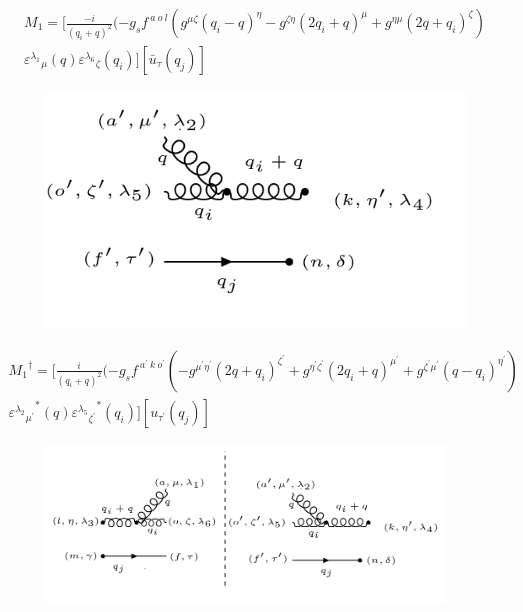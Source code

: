\begin{equation}
\begin{split}
M_1=[\frac{-i}{(q_i +q)^2}(-g_s f^{\:a\:o\:l}(g^{{\mu}{\zeta}}(q_i-q)^{\eta}-g^{{\zeta}{\eta}}(2q_i +q)^{\mu}+g^{{\eta}{\mu}}(2q +q_i)^{\zeta})\\
{\varepsilon^{\lambda_1}}_{\mu} (q) {\varepsilon^{\lambda_6}}_{\zeta} (q_i)][\bar{u}_{\tau}(q_j)]
\end{split}
\end{equation}
\begin{figure}[ht!]
\centering
\includegraphics[scale=0.7]{images/ggqM1dagger.png}
\end{figure}
\begin{equation}
\begin{split}
{M_1}^{\dagger}=[\frac{i}{(q_i +q)^2}(-g_s f^{\:a^{\prime}\:k\: o^{\prime}}(-g^{{{\mu}^{\prime}}{{\eta}^{\prime}}}(2q+q_i)^{{\zeta}^{\prime}}+g^{{{\eta}^{\prime}}{{\zeta}^{\prime}}}(2q_i +q)^{{\mu}^{\prime}}+g^{{{\zeta}^{\prime}}{{\mu}^{\prime}}}(q-q_i)^{{\eta}^{\prime}})\\
{{\varepsilon^{\lambda_2}}_{{\mu}^{\prime}}}^* (q) {{\varepsilon^{\lambda_5}}_{{\zeta}^{\prime}}}^* (q_i)][{u}_{{\tau}^{\prime}}(q_j)]
\end{split}
\end{equation}
\begin{figure}[ht!]
\centering
\includegraphics[width=0.95\textwidth]{images/ggqM1squer.png}
\end{figure}
